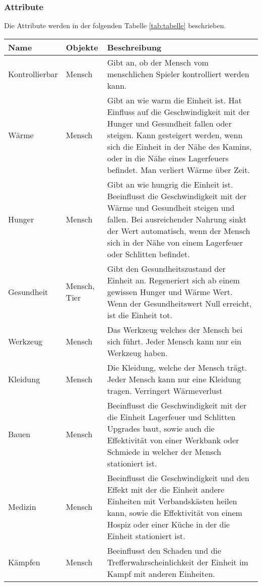 \documentclass[a4paper,
  twoside, %
  headlines=2.1 %
  ]{scrartcl}
\begin{document}
			\subsubsection {Attribute}
			 Die Attribute werden in der folgenden Tabelle \ref{tab:tabelle}  beschrieben.
			\begin{center}
			
			\begin{longtable}{ | p{2.5cm} | p{2cm} | p{10cm} | }
			    \hline
			    Name & Objekte & Beschreibung \\
			    \hline
			    Kontrollierbar & Mensch & Gibt an, ob der Mensch vom menschlichen Spieler kontrolliert werden kann. \\
			    \hline
				Wärme & Mensch & Gibt an wie warm die Einheit ist. Hat Einfluss auf die Geschwindigkeit mit der Hunger und Gesundheit fallen oder steigen. Kann gesteigert werden, wenn sich die Einheit in der Nähe des Kamins, oder in die Nähe eines Lagerfeuers befindet. Man verliert Wärme über Zeit. \\
				\hline
				Hunger & Mensch & Gibt an wie hungrig die Einheit ist. Beeinflusst die Geschwindigkeit mit der Wärme und Gesundheit steigen und fallen. Bei ausreichender Nahrung sinkt der Wert automatisch, wenn der Mensch sich in der Nähe von einem Lagerfeuer oder Schlitten befindet. \\
				\hline
				Gesundheit & Mensch, Tier & Gibt den Gesundheitszustand der Einheit an. Regeneriert sich ab einem gewissen Hunger und Wärme Wert. Wenn der Gesundheitswert Null erreicht, ist die Einheit tot. \\
				\hline
				Werkzeug & Mensch & Das Werkzeug welches der Mensch bei sich führt. Jeder Mensch kann nur ein Werkzeug haben. \\
				\hline
				Kleidung & Mensch & Die Kleidung, welche der Mensch trägt. Jeder Mensch kann nur eine Kleidung tragen. Verringert Wärmeverlust\\
				\hline
				Bauen & Mensch & Beeinflusst die Geschwindigkeit mit der die Einheit Lagerfeuer und Schlitten Upgrades baut, sowie auch die Effektivität von einer Werkbank oder Schmiede in welcher der Mensch stationiert ist. \\
				\hline
				Medizin & Mensch & Beeinflusst die Geschwindigkeit und den Effekt mit der die Einheit andere Einheiten mit Verbandskästen heilen kann, sowie die Effektivität von einem Hospiz oder einer Küche in der die Einheit stationiert ist. \\
				\hline
				Kämpfen & Mensch & Beeinflusst den Schaden und die Trefferwahrscheinlichkeit der Einheit im Kampf mit anderen Einheiten. \\

\end{longtable}
\end{center}
\end{document}
